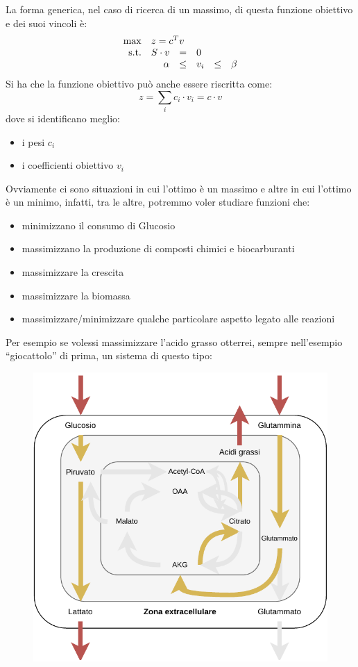 \documentclass[a4paper,12pt, oneside]{book}
\begin{document}
La forma generica, nel caso di ricerca di un massimo, di questa funzione
obiettivo e dei suoi vincoli è: 
\begin{equation*}
  \begin{array}{rrclcl}
    \displaystyle \max & \multicolumn{3}{l}{z=c^Tv} \\
    \textrm{s.t.} & S\cdot v & = & 0 \\
                       & \alpha & \leq & v_i & \leq& \beta \\
  \end{array}
\end{equation*}
Si ha che la funzione obiettivo può anche essere riscritta come:
\[z=\sum_i c_i\cdot v_i=c\cdot v\]
dove si identificano meglio:
\begin{itemize}
  \item i pesi $c_i$
  \item i coefficienti obiettivo $v_i$
\end{itemize}
Ovviamente ci sono situazioni in cui l'ottimo è un massimo e altre in cui
l'ottimo è un minimo, infatti, tra le altre, potremmo voler studiare funzioni
che:
\begin{itemize}
  \item minimizzano il consumo di Glucosio
  \item massimizzano la produzione di composti chimici e biocarburanti
  \item massimizzare la crescita
  \item massimizzare la biomassa
  \item massimizzare/minimizzare qualche particolare aspetto legato alle reazioni
\end{itemize}
Per esempio se volessi massimizzare l'acido grasso otterrei, sempre nell'esempio
``giocattolo'' di prima, un sistema di questo tipo:
\begin{figure}[H]
  \centering
  \includegraphics[scale = 0.7]{img/toy5.pdf}
\end{figure}
\end{document}
